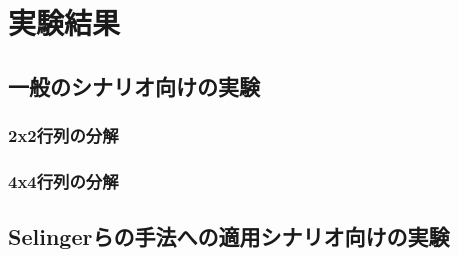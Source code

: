 \chapter{実験結果}\label{chap:experiment}
\section{一般のシナリオ向けの実験}
\subsection{2x2行列の分解}
\subsection{4x4行列の分解}
\section{Selingerらの手法への適用シナリオ向けの実験}
